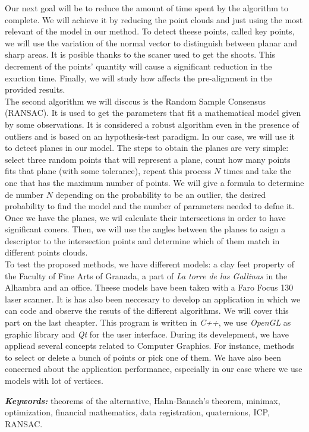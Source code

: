 Our next goal will be to reduce the amount of time spent by the algorithm to complete. We will achieve it by reducing the point clouds and just using the most relevant of the model in our method. To detect theese points, called key points, we will use the variation of the normal vector to distinguish between planar and sharp areas. It is posible thanks to the scaner used to get the shoots. This decrement of the points' quantity will cause a significant reduction in the exuction time. Finally, we will study how affects the pre-alignment in the provided results.  \\

The second algorithm we will disccus is the Random Sample Consensus (RANSAC). It is used to get the parameters that fit a mathematical model given by some observations. It is considered a robust algorithm even in the presence of outliers and is based on an hypothesis-test paradigm. In our case, we will use it to detect planes in our model. The steps to obtain the planes are very simple: select three random points that will represent a plane, count how many points fits that plane (with some tolerance), repeat this process $ N $ times and take the one that has the maximum number of points. We will give a formula to determine de number $ N $ depending on the probability to be an outlier, the desired probability to find the model and the number of parameters needed to defne it. Once we have the planes, we wil calculate their intersections in order to have significant coners. Then, we will use the angles between the planes to asign a descriptor to the intersection points and determine which of them match in different points clouds.\\

To test the proposed methods, we have different models: a clay feet property of the Faculty of Fine Arts of Granada, a part of \textit{La torre de las Gallinas} in the Alhambra and an office. Theese models have been taken with a Faro Focus 130 laser scanner. It is has also been neccesary to develop an application in which we can code and observe the resuts of the different algorithms. We will cover this part on the last cheapter. This program is written in \textit{C++}, we use \textit{OpenGL} as graphic library and \textit{Qt} for the user interface. During its develepment, we have appliead several concepts related to Computer Graphics. For instance, methods to select or delete a bunch of points or pick one of them. We have also been concerned about the application performance, especially in our case where we use models with lot of vertices.\\

\providecommand{\keywords}[1]
{
	\small	
	\textbf{\textit{Keywords: }} #1
}
\keywords{theorems of the alternative, Hahn-Banach's theorem, minimax, optimization, financial mathematics, data registration, quaternions, ICP, RANSAC.}